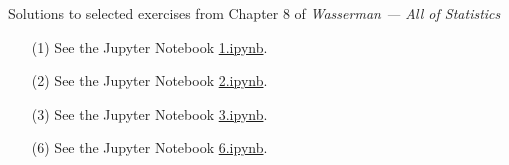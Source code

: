 \documentclass[10pt]{article}
\begin{document}
\noindent \large{Solutions to selected exercises from Chapter 8 of
\emph{Wasserman --- All of Statistics}}

\begin{enumerate}
\item[(1)]
See the Jupyter Notebook
\href{https://github.com/ajrasmus/some_of_statistics/blob/main/chapter_8/1.ipynb}{1.ipynb}.

\item[(2)]
See the Jupyter Notebook
\href{https://github.com/ajrasmus/some_of_statistics/blob/main/chapter_8/2.ipynb}{2.ipynb}.

\item[(3)]
See the Jupyter Notebook
\href{https://github.com/ajrasmus/some_of_statistics/blob/main/chapter_8/3.ipynb}{3.ipynb}.

\item[(6)]
See the Jupyter Notebook
\href{https://github.com/ajrasmus/some_of_statistics/blob/main/chapter_8/6.ipynb}{6.ipynb}.

\end{enumerate}
\end{document}
